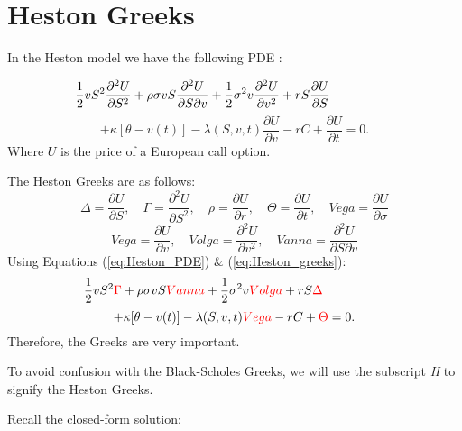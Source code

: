 \documentclass[a4paper]{article}
\begin{document}
\section{Heston Greeks}

In the Heston model we have the following PDE \cite{Heston_1993}:

\begin{equation*}
	\hspace{-50pt} \frac{1}{2}vS^2\frac{\partial^2 U}{\partial S^2} + \rho \sigma vS\frac{\partial^2 U}{\partial S \partial v} + \frac{1}{2} \sigma^2 v \frac{\partial^2 U}{\partial v^2} + rS\frac{\partial U}{\partial S}
\end{equation*}
\begin{equation}
	+ {\kappa [\theta-v(t)] - \lambda(S,v,t)}\frac{\partial U}{\partial v} -rC + \frac{\partial U}{\partial t} = 0.
	\label{eq:Heston_PDE}
\end{equation}
Where $U$ is the price of a European call option.

The Heston Greeks are as follows:
\begin{equation*}
	\Delta = \frac{\partial U}{\partial S}, \quad \Gamma = \frac{\partial^2 U}{\partial S^2}, \quad \rho = \frac{\partial U}{\partial r}, \quad \Theta = \frac{\partial U}{\partial t}, \quad Vega = \frac{\partial U}{\partial \sigma}
\end{equation*}
\begin{equation}
	Vega = \frac{\partial U}{\partial v}, \quad Volga = \frac{\partial^2 U}{\partial v^2}, \quad Vanna = \frac{\partial^2 U}{\partial S \partial v}
	\label{eq:Heston_greeks}
\end{equation}
Using Equations (\ref{eq:Heston_PDE}) \& (\ref{eq:Heston_greeks}):
\begin{equation*}
	\hspace{-50pt} \frac{1}{2}vS^2\textcolor{red}{\Gamma} + \rho \sigma vS\textcolor{red}{Vanna} + \frac{1}{2} \sigma^2 v \textcolor{red}{Volga} + rS\textcolor{red}{\Delta}
\end{equation*}
\begin{equation}
	+ {\kappa [\theta-v(t)] - \lambda(S,v,t)}\textcolor{red}{Vega} -rC + \textcolor{red}{\Theta} = 0.
\end{equation}
Therefore, the Greeks are very important. 

To avoid confusion with the Black-Scholes Greeks, we will use the subscript \textit{H} to signify the Heston Greeks. 

Recall the closed-form solution:
\end{document}
